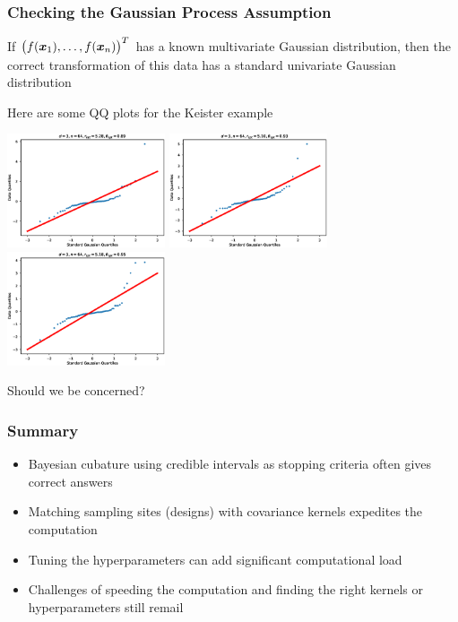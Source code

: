 \documentclass[11pt,compress,xcolor={usenames,dvipsnames},aspectratio=169]{beamer}
\begin{document}
\begin{frame}[fragile]\frametitle{Checking the Gaussian Process Assumption}

\vspace{-3ex}
If $\bigl(f(\boldsymbol{x}_1), \ldots, f(\boldsymbol{x}_n)\bigr) ^T$ has a known multivariate Gaussian distribution, then the correct transformation of this data has a standard univariate Gaussian distribution

Here are some QQ plots for the Keister example

\centerline{\includegraphics[width=0.35\textwidth]{figures/Keister-QQPlot_n-64_d-3_case-7.eps} \hspace{-3ex}
	\includegraphics[width=0.35\textwidth]{figures/Keister-QQPlot_n-64_d-3_case-1.eps} \hspace{-3ex}
	\includegraphics[width=0.35\textwidth]{figures/Keister-QQPlot_n-64_d-3_case-2.eps}}

Should we be concerned?

\end{frame}




\begin{frame}\frametitle{Summary}
	
\vspace{-5ex}
	
\begin{itemize}
	\item Bayesian cubature using credible intervals as stopping criteria often gives correct answers
	
	\item Matching sampling sites (designs) with covariance kernels expedites the computation
	
	\item Tuning the hyperparameters can add significant computational load
	
	\item Challenges of speeding the computation and finding the right kernels or hyperparameters still remail
\end{itemize}
	
\end{frame}
\end{document}
